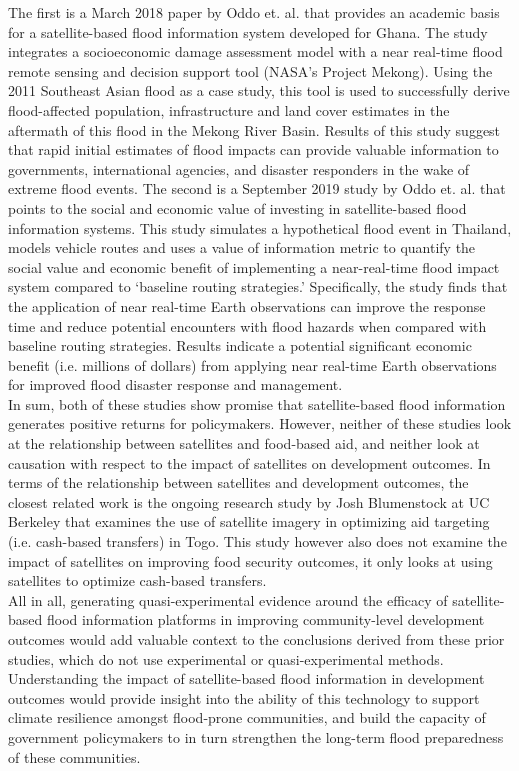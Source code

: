 The first is a March 2018 paper by Oddo et. al.\cite{oddo2018socioeconomic} that provides an academic basis for a satellite-based flood information system developed for Ghana. The study integrates a socioeconomic damage assessment model with a near real-time flood remote sensing and decision support tool (NASA’s Project Mekong). Using the 2011 Southeast Asian flood as a case study, this tool is used to successfully derive flood-affected population, infrastructure and land cover estimates in the aftermath of this flood in the Mekong River Basin. Results of this study suggest that rapid initial estimates of flood impacts can provide valuable information to governments, international agencies, and disaster responders in the wake of extreme flood events. The second is a September 2019 study by Oddo et. al.\cite{oddo2019value} that points to the social and economic value of investing in satellite-based flood information systems. This study simulates a hypothetical flood event in Thailand, models vehicle routes and uses a value of information metric to quantify the social value and economic benefit of implementing a near-real-time flood impact system compared to ‘baseline routing strategies.’ Specifically, the study finds that the application of near real-time Earth observations can improve the response time and reduce potential encounters with flood hazards when compared with baseline routing strategies. Results indicate a potential significant economic benefit (i.e. millions of dollars) from applying near real-time Earth observations for improved flood disaster response and management.\\

In sum, both of these studies show promise that satellite-based flood information generates positive returns for policymakers. However, neither of these studies look at the relationship between satellites and food-based aid, and neither look at causation with respect to the impact of satellites on development outcomes. In terms of the relationship between satellites and development outcomes, the closest related work is the ongoing research study by Josh Blumenstock at UC Berkeley that examines the use of satellite imagery in optimizing aid targeting (i.e. cash-based transfers) in Togo\cite{blumenstocktogo}. This study however also does not examine the impact of satellites on improving food security outcomes, it only looks at using satellites to optimize cash-based transfers.\\

All in all, generating quasi-experimental evidence around the efficacy of satellite-based flood information platforms in improving community-level development outcomes would add valuable context to the conclusions derived from these prior studies, which do not use experimental or quasi-experimental methods. Understanding the impact of satellite-based flood information in development outcomes would provide insight into the ability of this technology to support climate resilience amongst flood-prone communities, and build the capacity of government policymakers to in turn strengthen the long-term flood preparedness of these communities. 
